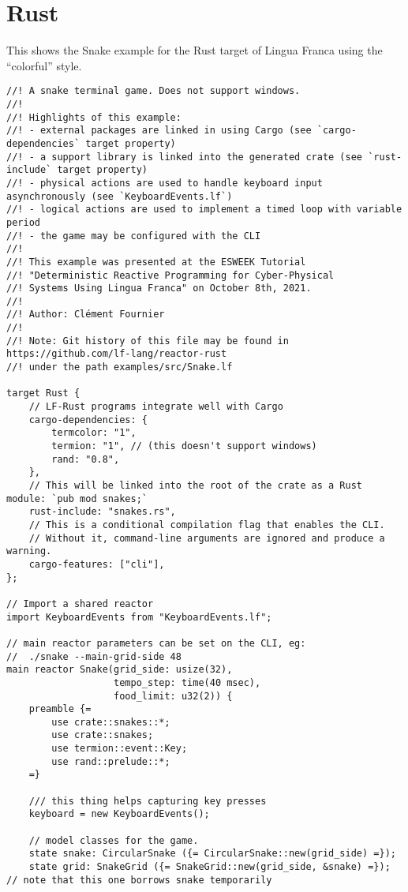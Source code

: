 \documentclass{article}
\begin{document}
\newpage
\section{Rust}

This shows the Snake example for the Rust target of Lingua Franca using the
``colorful'' style.

\begin{verbatim}
//! A snake terminal game. Does not support windows.
//!
//! Highlights of this example:
//! - external packages are linked in using Cargo (see `cargo-dependencies` target property)
//! - a support library is linked into the generated crate (see `rust-include` target property)
//! - physical actions are used to handle keyboard input asynchronously (see `KeyboardEvents.lf`)
//! - logical actions are used to implement a timed loop with variable period
//! - the game may be configured with the CLI
//!
//! This example was presented at the ESWEEK Tutorial
//! "Deterministic Reactive Programming for Cyber-Physical
//! Systems Using Lingua Franca" on October 8th, 2021.
//!
//! Author: Clément Fournier
//!
//! Note: Git history of this file may be found in https://github.com/lf-lang/reactor-rust
//! under the path examples/src/Snake.lf

target Rust {
    // LF-Rust programs integrate well with Cargo
    cargo-dependencies: {
        termcolor: "1",
        termion: "1", // (this doesn't support windows)
        rand: "0.8",
    },
    // This will be linked into the root of the crate as a Rust module: `pub mod snakes;`
    rust-include: "snakes.rs",
    // This is a conditional compilation flag that enables the CLI.
    // Without it, command-line arguments are ignored and produce a warning.
    cargo-features: ["cli"],
};

// Import a shared reactor
import KeyboardEvents from "KeyboardEvents.lf";

// main reactor parameters can be set on the CLI, eg:
//  ./snake --main-grid-side 48
main reactor Snake(grid_side: usize(32),
                   tempo_step: time(40 msec),
                   food_limit: u32(2)) {
    preamble {=
        use crate::snakes::*;
        use crate::snakes;
        use termion::event::Key;
        use rand::prelude::*;
    =}

    /// this thing helps capturing key presses
    keyboard = new KeyboardEvents();

    // model classes for the game.
    state snake: CircularSnake ({= CircularSnake::new(grid_side) =});
    state grid: SnakeGrid ({= SnakeGrid::new(grid_side, &snake) =}); // note that this one borrows snake temporarily


\end{verbatim}
\end{document}
